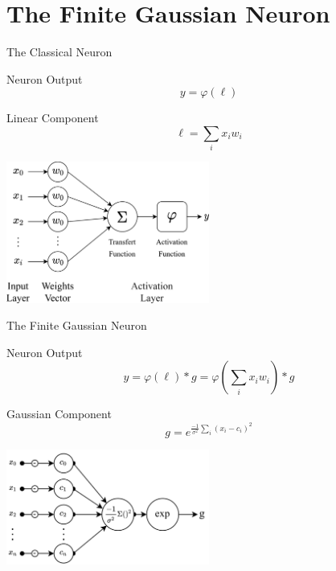 \documentclass{beamer}
\begin{document}
    



\section{The Finite Gaussian Neuron}

\begin{frame}{The Classical Neuron}
    \begin{block}{Neuron Output}
        \vspace{-1.5mm}
        $$y = \varphi(\ell)$$
    \end{block}
    \begin{block}{Linear Component}
        $$\ell=\sum_i x_i w_i$$
    \end{block}
    \begin{center}
        \includegraphics[width=0.5\textwidth]{images/classic-neuron.png}
    \end{center}
\end{frame}

\begin{frame}{The Finite Gaussian Neuron}
    \begin{block}{Neuron Output}
        $$ y =  \varphi(\ell)*g = \varphi(\sum_i x_i w_i) * g$$
    \end{block}
    \begin{block}{Gaussian Component}
    $$ g = e^{\frac{-1}{\sigma^2}\sum_{i}(x_i-c_i)^2}$$
    \end{block}
    \begin{center}
        \includegraphics[width=0.5\textwidth]{images/fgn-gaussian-component.png}
    \end{center}
\end{frame}
\end{document}
